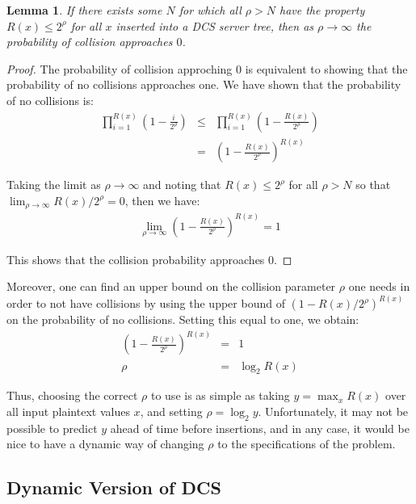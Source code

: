 \documentclass[12pt]{article}
\newtheorem{lemma}{Lemma}
\begin{document}
\begin{lemma}
  If there exists some $N$ for which all $\rho > N$ have the property $R(x) \leq 2^{\rho}$ for all $x$ inserted into a DCS server tree, then as $\rho \to \infty$ the probability of collision approaches $0$.
\end{lemma}
\begin{proof}
  The probability of collision approching 0 is equivalent to showing that the probability of no collisions approaches one. We have shown that the probability of no collisions is:
  \begin{eqnarray}
    \prod_{i=1}^{R(x)} \left(1 - \frac{i}{2^{\rho}} \right) &\leq& \prod_{i=1}^{R(x)} \left(1 - \frac{R(x)}{2^{\rho}} \right) \\
                                                    &=& \left(1 - \frac{R(x)}{2^{\rho}} \right)^{R(x)}
  \end{eqnarray}

  Taking the limit as $\rho \to \infty$ and noting that $R(x) \leq 2^{\rho}$ for all $\rho > N$ so that $\lim_{\rho \to \infty} R(x) / 2^{\rho} = 0$, then we have:
  \begin{eqnarray}
    \lim_{\rho \to \infty} \left(1 - \frac{R(x)}{2^{\rho}} \right)^{R(x)} = 1
  \end{eqnarray}

  This shows that the collision probability approaches 0.
\end{proof}

Moreover, one can find an upper bound on the collision parameter $\rho$ one needs in order to not have collisions by using the upper bound of $(1 - R(x)/2^{\rho})^{R(x)}$ on the probability of no collisions. Setting this equal to one, we obtain:
\begin{eqnarray}
  \left(1 - \frac{R(x)}{2^{\rho}} \right)^{R(x)} &=& 1 \\
                                            \rho &=& \log_2 R(x)
\end{eqnarray}

Thus, choosing the correct $\rho$ to use is as simple as taking $y = \max_x R(x)$ over all input plaintext values $x$, and setting $\rho = \log_2 y$. Unfortunately, it may not be possible to predict $y$ ahead of time before insertions, and in any case, it would be nice to have a dynamic way of changing $\rho$ to the specifications of the problem.

\subsection{Dynamic Version of DCS}
\end{document}
